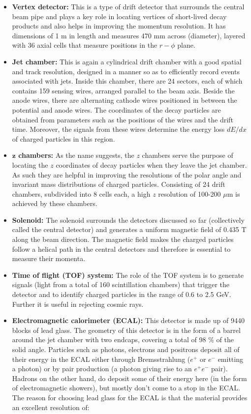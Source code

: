 \begin{itemize}
\item \textbf{Vertex detector:} This is a type of drift detector that surrounds the central beam pipe and plays a key role in locating vertices of short-lived decay products and also helps in improving the momentum resolution. It has dimensions of 1 m in length and measures 470 mm across (diameter), layered with 36 axial cells that measure positions in the $r-\phi$ plane.  
\item \textbf{Jet chamber:} This is again a cylindrical drift chamber with a good spatial and track resolution, designed in a manner so as to efficiently record events associated with jets. Inside this chamber, there are 24 sectors, each of which contains 159 sensing wires, arranged parallel to the beam axis. Beside the anode wires, there are alternating cathode wires positioned in between the potential and anode wires. The coordinates of the decay particles are obtained from parameters such as the positions of the wires and the drift time. Moreover, the signals from these wires determine the energy loss $dE/dx$ of charged particles in this region.
\item \textbf{$\mathbf{z}$ chambers:} As the name suggests, the $z$ chambers serve the purpose of locating the $z$ coordinates of decay particles when they leave the jet chamber. As such they are helpful in improving the resolutions of the polar angle and invariant mass distributions of charged particles. Consisting of 24 drift chambers, subdivided into 8 cells each, a high $z$ resolution of 100-200 $\mu$m is achieved by these chambers.
\item \textbf{Solenoid:} The solenoid surrounds the detectors discussed so far (collectively called the central detector) and generates a uniform magnetic field of 0.435 T along the beam direction. The magnetic field makes the charged particles follow a helical path in the central detectors and therefore is essential to measure their momenta. 
\item \textbf{Time of flight (TOF) system:} The role of the TOF system is to generate signals (light from a total of 160 scintillation chambers) that trigger the detector and to identify charged particles in the range of 0.6 to 2.5 GeV. Further it is useful in rejecting cosmic rays.
\item \textbf{Electromagnetic calorimeter (ECAL):} This detector is made up of 9440 blocks of lead glass. The geometry of this detector is in the form of a barrel around the jet chamber with two endcaps, covering a total of 98 \% of the solid angle. Particles such as photons, electrons and positrons deposit all of their energy in the ECAL either through Bremsstrahlung ($e^{+}$ or $e^{-}$ emitting a photon) or by pair production (a photon giving rise to an $e^{+}e^{-}$ pair). Hadrons on the other hand, do deposit some of their energy here (in the form of electromagnetic showers), but mostly don't come to a stop in the ECAL. The reason for choosing lead glass for the ECAL is that the material provides an excellent resolution of:

\end{itemize}

